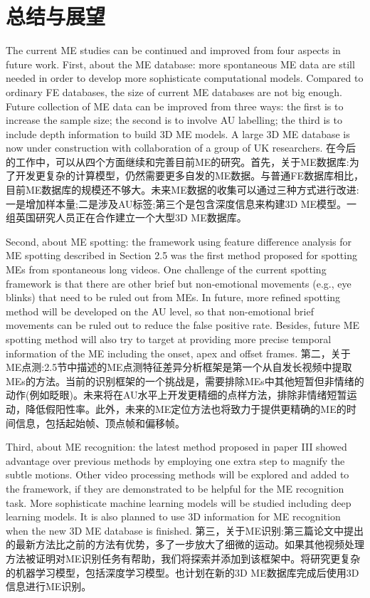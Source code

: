 \chapter{总结与展望}\label{chap:conclusions}

The current ME studies can be continued and improved from four aspects in future work. First, about the ME database: more spontaneous ME data are still needed in order to develop more sophisticate computational models. Compared to ordinary FE databases, the size of current ME databases are not big enough. Future collection of ME data can be improved from three ways: the first is to increase the sample size; the second is to involve AU labelling; the third is to include depth information to build 3D ME models. A large 3D ME database is now under construction with collaboration of a group of UK researchers.
在今后的工作中，可以从四个方面继续和完善目前ME的研究。首先，关于ME数据库:为了开发更复杂的计算模型，仍然需要更多自发的ME数据。与普通FE数据库相比，目前ME数据库的规模还不够大。未来ME数据的收集可以通过三种方式进行改进:一是增加样本量;二是涉及AU标签;第三个是包含深度信息来构建3D ME模型。一组英国研究人员正在合作建立一个大型3D ME数据库。

Second, about ME spotting: the framework using feature difference analysis for ME spotting described in Section 2.5 was the first method proposed for spotting MEs from spontaneous long videos. One challenge of the current spotting framework is that there are other brief but non-emotional movements (e.g., eye blinks) that need to be ruled out from MEs. In future, more refined spotting method will be developed on the AU level, so that non-emotional brief movements can be ruled out to reduce the false positive rate. Besides, future ME spotting method will also try to target at providing more precise temporal information of the ME including the onset, apex and offset frames.
第二，关于ME点测:2.5节中描述的ME点测特征差异分析框架是第一个从自发长视频中提取MEs的方法。当前的识别框架的一个挑战是，需要排除MEs中其他短暂但非情绪的动作(例如眨眼)。未来将在AU水平上开发更精细的点样方法，排除非情绪短暂运动，降低假阳性率。此外，未来的ME定位方法也将致力于提供更精确的ME的时间信息，包括起始帧、顶点帧和偏移帧。

Third, about ME recognition: the latest method proposed in paper III showed advantage over previous methods by employing one extra step to magnify the subtle motions. Other video processing methods will be explored and added to the framework, if they are demonstrated to be helpful for the ME recognition task. More sophisticate machine learning models will be studied including deep learning models. It is also planned to use 3D information for ME recognition when the new 3D ME database is finished.
第三，关于ME识别:第三篇论文中提出的最新方法比之前的方法有优势，多了一步放大了细微的运动。如果其他视频处理方法被证明对ME识别任务有帮助，我们将探索并添加到该框架中。将研究更复杂的机器学习模型，包括深度学习模型。也计划在新的3D ME数据库完成后使用3D信息进行ME识别。

